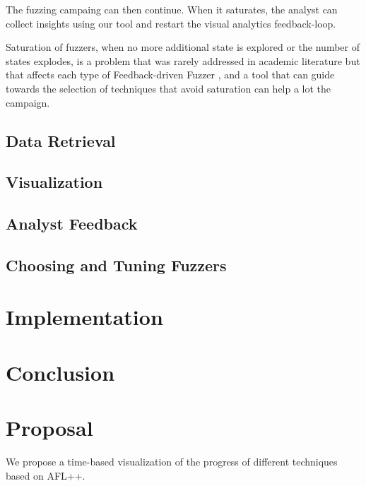 \documentclass[conference,compsoc]{IEEEtran}
\begin{document}
The fuzzing campaing can then continue. When it saturates, the analyst can collect insights using our tool and restart the visual analytics feedback-loop.

Saturation of fuzzers, when no more additional state is explored or the number of states explodes, is a problem that was rarely addressed in academic literature but that affects each type of Feedback-driven Fuzzer \cite{saturation},  and a tool that can guide towards the selection of techniques that avoid saturation can help a lot the campaign.

\subsection{Data Retrieval}




\subsection{Visualization}

\subsection{Analyst Feedback}

\subsection{Choosing and Tuning Fuzzers}

\section{Implementation}


\section{Conclusion}





\iffalse
\section{Proposal}

We propose a time-based visualization of the progress of different techniques based on {\sc AFL++}.
\end{document}
